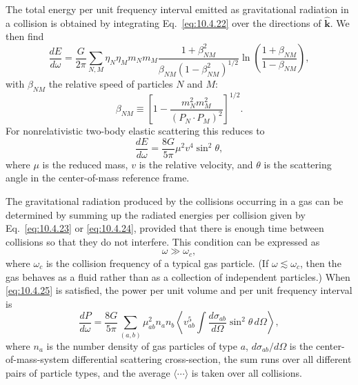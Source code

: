 The total energy per unit frequency interval emitted as gravitational
radiation in a collision is obtained by integrating Eq.~\eqref{eq:10.4.22}
over the directions of \(\widehat{\mathbf{k}}\). We then find
\begin{equation}
  \frac{dE}{d\omega}
  =
  \frac{G}{2\pi}
  \sum_{N,M}\eta_N\eta_Mm_Nm_M
  \frac{1+\beta_{NM}^2}
       {\beta_{NM}(1-\beta_{NM}^2)^{1/2}}
  \ln\!\left(\frac{1+\beta_{NM}}{1-\beta_{NM}}\right),
  \tag{10.4.23}\label{eq:10.4.23}
\end{equation}
with \(\beta_{NM}\) the relative speed of particles \(N\) and \(M\):
\[
  \beta_{NM}
  \equiv
  \left[
    1-\frac{m_N^2m_M^2}{(P_N\cdot P_M)^2}
  \right]^{1/2}.
\]
For nonrelativistic two-body elastic scattering this reduces to
\begin{equation}
  \frac{dE}{d\omega}
  =
  \frac{8G}{5\pi}\mu^2v^4\sin^2\theta,
  \tag{10.4.24}\label{eq:10.4.24}
\end{equation}
where \(\mu\) is the reduced mass, \(v\) is the relative velocity, and
\(\theta\) is the scattering angle in the center-of-mass reference frame.

The gravitational radiation produced by the collisions occurring in a gas
can be determined by summing up the radiated energies per collision given by
Eq.~\eqref{eq:10.4.23} or \eqref{eq:10.4.24}, provided that there is enough
time between collisions so that they do not interfere. This condition can be
expressed as
\begin{equation}
  \omega\gg\omega_c,
  \tag{10.4.25}\label{eq:10.4.25}
\end{equation}
where \(\omega_c\) is the collision frequency of a typical gas particle. (If
\(\omega\lesssim\omega_c\), then the gas behaves as a fluid rather than as a
collection of independent particles.) When \eqref{eq:10.4.25} is satisfied,
the power per unit volume and per unit frequency interval is
\begin{equation}
  \frac{dP}{d\omega}
  =
  \frac{8G}{5\pi}
  \sum_{(a,b)}\mu_{ab}^2n_an_b
  \left\langle
    v_{ab}^5
    \int\frac{d\sigma_{ab}}{d\Omega}\sin^2\theta\,d\Omega
  \right\rangle,
  \tag{10.4.26}\label{eq:10.4.26}
\end{equation}
where \(n_a\) is the number density of gas particles of type \(a\),
\(d\sigma_{ab}/d\Omega\) is the center-of-mass-system differential
scattering cross-section, the sum runs over all different pairs of particle
types, and the average \(\langle\cdots\rangle\) is taken over all collisions.

